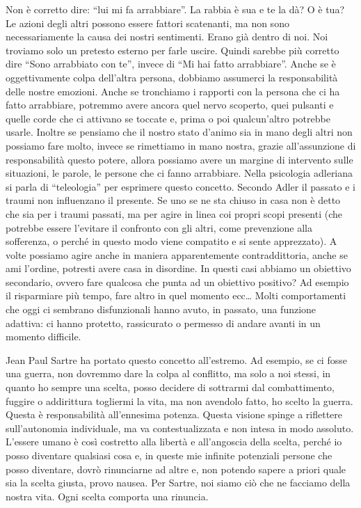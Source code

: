 \documentclass[12pt]{book} %
\begin{document}
Non è corretto dire: “lui mi fa arrabbiare”. La rabbia è sua e te la dà? O è tua? Le azioni degli altri possono essere fattori scatenanti, ma non sono necessariamente la causa dei nostri sentimenti. Erano già dentro di noi. Noi
troviamo solo un pretesto esterno per farle uscire. Quindi sarebbe più corretto dire “Sono arrabbiato con te”, invece
di “Mi hai fatto arrabbiare”. Anche se è oggettivamente colpa dell'altra persona, dobbiamo assumerci la responsabilità delle nostre emozioni. Anche se tronchiamo i rapporti con la persona che ci ha fatto arrabbiare, potremmo avere ancora quel nervo scoperto, quei pulsanti e quelle corde che ci attivano se toccate e, prima o poi qualcun'altro potrebbe usarle. Inoltre se pensiamo che il nostro stato d'animo sia in mano degli altri non possiamo fare molto, invece se rimettiamo in mano nostra, grazie all'assunzione di responsabilità questo potere, allora possiamo avere un margine di intervento sulle situazioni, le parole, le persone che ci fanno arrabbiare.
Nella psicologia adleriana si parla di “teleologia” per esprimere questo concetto.
Secondo Adler il passato e i traumi non influenzano il presente. Se uno se ne sta chiuso in casa non è detto che sia per i traumi
passati, ma per agire in linea coi propri scopi presenti (che potrebbe essere l'evitare il confronto
con gli altri, come prevenzione alla sofferenza, o perché in questo modo viene compatito e si sente apprezzato).
A volte possiamo agire anche in maniera apparentemente contraddittoria, anche se ami l'ordine, potresti avere casa in disordine. In questi casi abbiamo un obiettivo secondario, ovvero fare qualcosa che punta ad un obiettivo positivo? Ad esempio il risparmiare più tempo, fare altro in quel momento ecc…
Molti comportamenti che oggi ci sembrano disfunzionali hanno avuto, in passato, una funzione adattiva: ci hanno protetto, rassicurato o permesso di andare avanti in un momento difficile.

Jean Paul Sartre ha portato questo concetto all'estremo. Ad esempio, se ci fosse una guerra, non
dovremmo dare la colpa al conflitto, ma solo a noi stessi, in quanto ho sempre una scelta, posso decidere di sottrarmi
dal combattimento, fuggire o addirittura togliermi la vita, ma non avendolo fatto, ho scelto la guerra. Questa è
responsabilità all'ennesima potenza. Questa visione spinge a riflettere sull’autonomia individuale, ma va contestualizzata e non intesa in modo assoluto. L'essere umano è così costretto alla libertà e all'angoscia
della scelta, perché io posso diventare qualsiasi cosa e, in queste mie infinite potenziali persone che posso
diventare, dovrò rinunciarne ad altre e, non potendo sapere a priori quale sia la scelta giusta, provo nausea. Per
Sartre, noi siamo ciò che ne facciamo della nostra vita. 
Ogni scelta comporta una rinuncia. 
\end{document}
